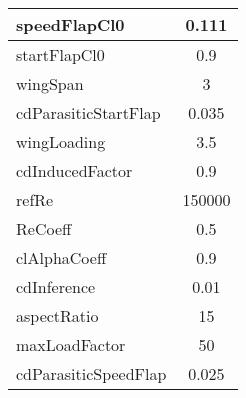    \begin{table}

       \begin{center}

            \begin{tabular}{|l|c|}

               \hline

speedFlapCl0 & 0.111 \\ \hline 

startFlapCl0 & 0.9 \\ \hline 

wingSpan & 3 \\ \hline 

cdParasiticStartFlap & 0.035 \\ \hline 

wingLoading & 3.5 \\ \hline 

cdInducedFactor & 0.9 \\ \hline 

refRe & 150000 \\ \hline 

ReCoeff & 0.5 \\ \hline 

clAlphaCoeff & 0.9 \\ \hline 

cdInference & 0.01 \\ \hline 

aspectRatio & 15 \\ \hline 

maxLoadFactor & 50 \\ \hline 

cdParasiticSpeedFlap & 0.025 \\ \hline 

            \end{tabular}

        \end{center}

    \end{table}

